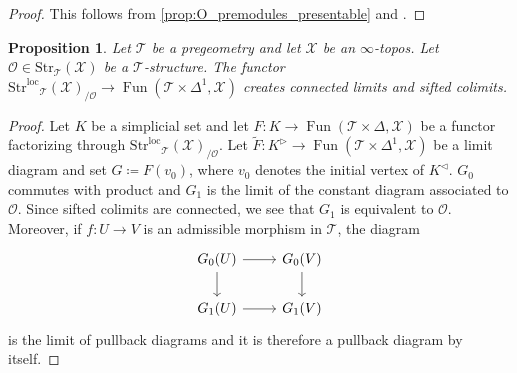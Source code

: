 \documentclass[12pt,a4paper,reqno]{amsart}
\theoremstyle{plain}
\newtheorem{prop}[thm]{Proposition}
\theoremstyle{definition}
\theoremstyle{remark}
\numberwithin{equation}{section}
\begin{document}
\begin{proof}
	This follows from \cref{prop:O_premodules_presentable} and \cite[Proposition 1.4.4.4.(1)]{Lurie_Higher_algebra}.
\end{proof}

\begin{prop} \label{prop:creating_connected_limits_sifted_colimits}
	Let ${\mathcal T}$ be a pregeometry and let ${\mathcal X}$ be an $\infty$-topos.
	Let ${\mathcal O} \in {\mathrm{Str}}_{\mathcal T}({\mathcal X})$ be a ${\mathcal T}$-structure.
	The functor ${\mathrm{Str}^\mathrm{loc}}_{\mathcal T}({\mathcal X})_{/{\mathcal O}} \to \operatorname{Fun}({\mathcal T} \times \Delta^1, {\mathcal X})$ creates connected limits and sifted colimits.
\end{prop}

\begin{proof}
	Let $K$ be a simplicial set and let $F \colon K \to \operatorname{Fun}({\mathcal T} \times \Delta, {\mathcal X})$ be a functor factorizing through ${\mathrm{Str}^\mathrm{loc}}_{\mathcal T}({\mathcal X})_{/ {\mathcal O}}$.
	Let $\widetilde{F} \colon K^\triangleright \to \operatorname{Fun}({\mathcal T} \times \Delta^1, {\mathcal X})$ be a limit diagram and set $G \coloneqq F(v_0)$, where $v_0$ denotes the initial vertex of $K^\triangleleft$.
	$G_0$ commutes with product and $G_1$ is the limit of the constant diagram associated to ${\mathcal O}$. Since sifted colimits are connected, we see that $G_1$ is equivalent to ${\mathcal O}$.
	Moreover, if $f \colon U \to V$ is an admissible morphism in ${\mathcal T}$, the diagram
	\[ \begin{tikzcd}
	G_0(U) \arrow{r} \arrow{d} & G_0(V) \arrow{d} \\
	G_1(U) \arrow{r} & G_1(V)
	\end{tikzcd} \]
	is the limit of pullback diagrams and it is therefore a pullback diagram by itself.
	

\end{proof}
\end{document}
